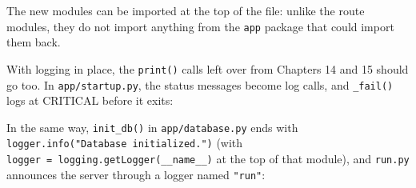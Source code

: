 \noindent{}The new modules can be imported at the top of the file: unlike the route modules, they do not import anything from the \texttt{app} package that could import them back.

With logging in place, the \texttt{print()} calls left over from Chapters 14 and 15 should go too. In \texttt{app/startup.py}, the status messages become log calls, and \texttt{\_fail()} logs at CRITICAL before it exits:

\begin{codebox}

\begin{Shaded}
\begin{Highlighting}[]

\OperatorTok{=}\NormalTok{)}

\NormalTok{)}

\NormalTok{)}
\NormalTok{)}

\NormalTok{) }\OperatorTok{{-}\textgreater{}} \NormalTok{:}
\NormalTok{)}
\end{Highlighting}
\end{Shaded}

\end{codebox}

\noindent{}In the same way, \texttt{init\_db()} in \texttt{app/database.py} ends with \texttt{logger.}\allowbreak{}\texttt{info("Database\ initialized.}\allowbreak{}\texttt{")} (with \texttt{logger\ =}\allowbreak{}\texttt{\ logging.}\allowbreak{}\texttt{getLogger(\_}\allowbreak{}\texttt{\_}\allowbreak{}\texttt{name\_}\allowbreak{}\texttt{\_}\allowbreak{}\texttt{)} at the top of that module), and \texttt{run.py} announces the server through a logger named \texttt{"run"}:

